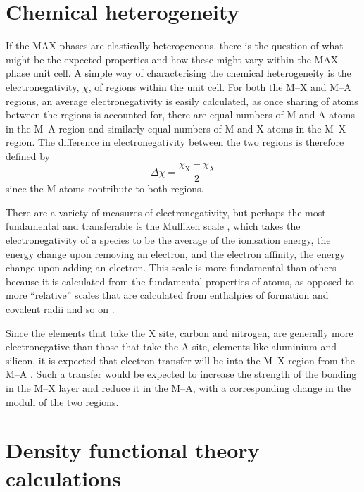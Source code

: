 \section{Chemical heterogeneity}




If the MAX phases are elastically heterogeneous, there is the question of what might be the expected properties and how these might vary within the MAX phase unit cell. A simple way of characterising the chemical heterogeneity is the electronegativity, $\chi$, of regions within the unit cell. For both the M--X and M--A regions, an average electronegativity is easily calculated, as once sharing of atoms between the regions is accounted for, there are equal numbers of M and A atoms in the M--A region and similarly equal numbers of M and X atoms in the M--X region. The difference in electronegativity between the two regions is therefore defined by
\begin{equation}
\Delta \chi = \frac{\chi_{\text{X}} - \chi_{\text{A}}}{2}\label{eqn:MAX_electronegativity_diff}
\end{equation}
since the M atoms contribute to both regions. 

There are a variety of measures of electronegativity, but perhaps the most fundamental and transferable is the Mulliken scale \cite{Mulliken1934}, which takes the electronegativity of a species to be the average of the ionisation energy, the energy change upon removing an electron, and the electron affinity, the energy change upon adding an electron. This scale is more fundamental than others because it is calculated from the fundamental properties of atoms, as opposed to more ``relative'' scales that are calculated from enthalpies of formation and covalent radii and so on \cite{huheey1983ch3_electronegativity}.

Since the elements that take the X site, carbon and nitrogen, are generally more electronegative than those that take the A site, elements like aluminium and silicon, it is expected that electron transfer will be into the M--X region from the M--A \cite{Sun2011}. Such a transfer would be expected to increase the strength of the bonding in the M--X layer and reduce it in the M--A, with a corresponding change in the moduli of the two regions.


\section{Density functional theory calculations}
\label{sec:DFT_method}



